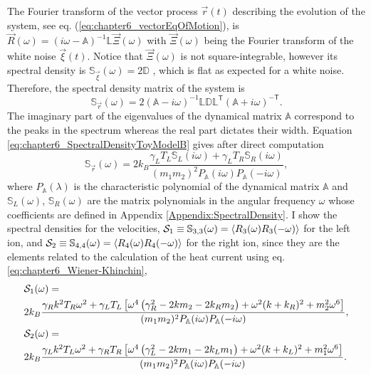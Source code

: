 The Fourier transform of the vector process $\overrightarrow{r}(t)$ describing the evolution of the system, see eq. (\ref{eq:chapter6_vectorEqOfMotion}),
is $\overrightarrow{R}(\omega) = \left( i \omega - \mathbb{A} \right)^{-1}\mathbb{L}\overrightarrow{\Xi}(\omega)$ with $\overrightarrow{\Xi}(\omega)$ being the Fourier transform of the white noise $\overrightarrow{\xi}(t)$. Notice that $\overrightarrow{\Xi}(\omega)$ is not square-integrable, however its spectral density is $\mathbb{S}_{\overrightarrow{\xi}}(\omega) = 2 \mathbb{D}$ \cite{Sarkka2019}, which is flat as expected for a white noise. Therefore, the spectral density matrix of the system is
%
\begin{equation}
  \mathbb{S}_{\overrightarrow{r}} (\omega)= 2 \left(  \mathbb{A} - i\omega\right)^{-1}\mathbb{L}\mathbb{D}\mathbb{L}^\mathsf{T}\left(  \mathbb{A} + i\omega\right)^{-\mathsf{T}}.
  \label{eq:chapter6_SpectralDensityToyModelB}
\end{equation}
%
The imaginary part of the eigenvalues of the dynamical matrix $\mathbb{A}$ correspond to the peaks in the spectrum whereas the real part dictates their width. Equation \eqref{eq:chapter6_SpectralDensityToyModelB} gives after direct computation
%
\begin{equation}
  \mathbb{S}_{\overrightarrow{r}}(\omega) = 2 k_B \frac{\gamma_L T_L\mathbb{S}_L(i\omega)+\gamma_L T_R\mathbb{S}_R(i\omega)}{(m_1 m_2)^2 P_\mathbb{A}(i\omega)P_\mathbb{A}(-i\omega)},
\end{equation}
%
where $P_\mathbb{A}(\lambda)$ is the characteristic polynomial of the dynamical matrix $\mathbb{A}$ and $\mathbb{S}_L(\omega)$, $\mathbb{S}_R(\omega)$ are the matrix polynomials in the angular frequency $\omega$ whose coefficients are defined in Appendix \ref{Appendix:SpectralDensity}. I show the spectral densities for the velocities, ${\cal{S}}_1\equiv\mathbb{S}_{3,3}(\omega) = \expval{R_3(\omega)R_3(-\omega)}$ for the left ion, and ${\cal S}_2\equiv\mathbb{S}_{4,4}(\omega) = \expval{R_4(\omega)R_4(-\omega)}$ for the right ion, since they are the elements related to the calculation of the heat current using eq. \eqref{eq:chapter6_Wiener-Khinchin},
%
  \begin{align}
    &{\cal S}_1(\omega) =\nonumber\\
    &2 k_B \frac{\gamma_R k^2 T_R \omega ^2+\gamma_L T_L \left[\omega ^4 \left(\gamma_R^2-2 k m_2-2 k_R m_2\right)+\omega ^2 (k+k_R)^2+m_2^2 \omega ^6\right]}{(m_1 m_2)^2 P_\mathbb{A}(i\omega)P_\mathbb{A}(-i\omega)},\nonumber\\
    &{\cal S}_2(\omega) = \nonumber\\
    &2 k_B \frac{\gamma_L k^2 T_L \omega ^2+\gamma_R T_R \left[\omega ^4 \left(\gamma_L^2-2 k m_1-2 k_L m_1\right)+\omega ^2 (k+k_L)^2+m_1^2 \omega ^6\right]}{(m_1 m_2)^2 P_\mathbb{A}(i\omega)P_\mathbb{A}(-i\omega)}.
    \label{eq:chapter6_SpectralDensitiesVelocities}
\end{align}
